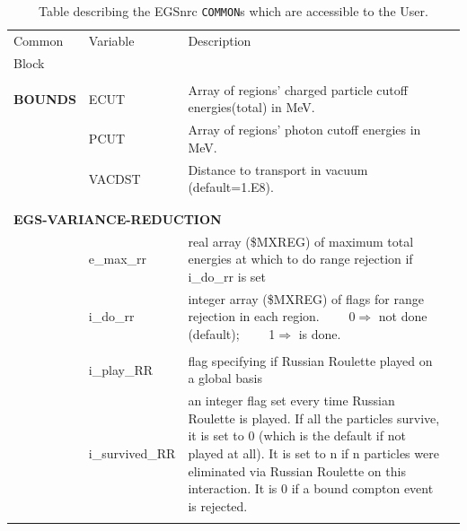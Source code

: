 \begin{table}[htb]
     
     
     
     
     
    



\begin{center}
\caption{Table describing the EGSnrc {\tt COMMON}s which are accessible to the
User.
\label{tab_commons}
}
\begin{tabular}{ l l   p{105mm}l  |}
\hline
Common & Variable & Description \\
Block &&\\
\hline
&&\\
{\bfseries BOUNDS} & ECUT &Array of regions' charged particle
                            cutoff energies(total) in MeV.\\
       & PCUT &Array of regions' photon cutoff
                            energies in MeV.\\
       & VACDST  &   Distance to transport in vacuum (default=1.E8).\\
&&\\
\hline
&&\\
\multicolumn{3}{l}{{\bfseries EGS-VARIANCE-REDUCTION}}\\
	&e\_max\_rr &real array (\$MXREG) of maximum total energies at which
                     to do range rejection if i\_do\_rr is set\\
	&i\_do\_rr &integer array (\$MXREG) of flags for range rejection
                    in each region. ~~~~0$\Rightarrow$ not done (default);
                      ~~~~1$\Rightarrow$ is done.\\
&&\\
	& i\_play\_RR & flag specifying if Russian Roulette played on a
                        global basis\\
        & i\_survived\_RR & an integer flag set every time Russian Roulette
is played. If all the particles survive, it is set to 0 (which is the default
if not played at all). It is set to n if n particles were eliminated via
Russian Roulette on this interaction. It is 0 if a bound compton event is
rejected.\\
&&\\

\end{tabular}
\end{center}
\end{table}
